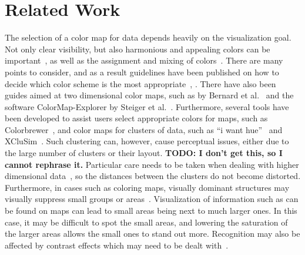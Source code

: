 \documentclass{egpubl}
\begin{document}
	\section{Related Work}

%		
	The selection of a color map for data depends heavily on the visualization goal. 
	Not only clear visibility, but also harmonious and appealing colors can be important~\cite{ihaka2003colour}, as well as the assignment and mixing of colors~\cite{wang2008color}. 
	There are many points to consider, and as a result guidelines have been published on how to decide which color scheme is the most appropriate~\cite{bergman1995rule}, \cite{healey1996choosing}. There have also been guides aimed at two dimensional color maps, such as by Bernard et al.~\cite{bernard2015survey} and the software ColorMap-Explorer by Steiger et al.~\cite{steiger2015explorative}.	
	Furthermore, several tools have been developed to assist users select appropriate colors for maps, such as Colorbrewer~\cite{harrower2003colorbrewer}, and color maps for clusters of data, such as ``i want hue''~\cite{iwanthue} and XCluSim~\cite{l2015xclusim}. 	
	Such clustering can, however, cause perceptual issues, either due to the large number of clusters or their layout. \textbf{TODO: I don't get this, so I cannot rephrase it.} 
	Particular care needs to be taken when dealing with higher dimensional data~\cite{mittelstiidt2014revisiting}, so the distances between the clusters do not become distorted. 
	Furthermore, in cases such as coloring maps, visually dominant structures may visually suppress small groups or areas~\cite{lee2013perceptually}.
	Visualization of information such as can be found on maps can lead to small areas being next to much larger ones. 
	In this case, it may be difficult to spot the small areas, and lowering the saturation of the larger areas allows the small ones to stand out more.
	Recognition may also be affected by contrast effects which may need to be dealt with~\cite{mittelstadt2014methods}. 
	
\end{document}
